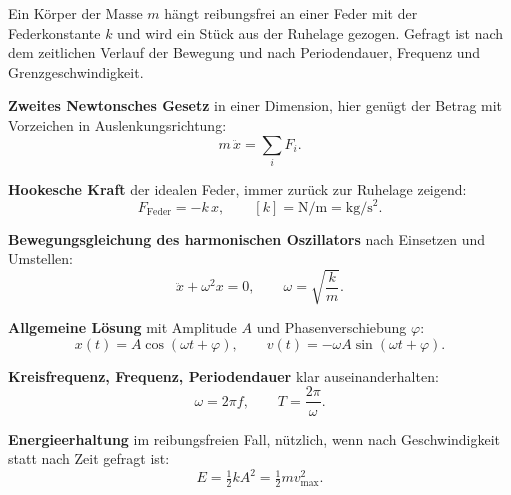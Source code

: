 

Ein Körper der Masse $m$ hängt reibungsfrei an einer Feder mit der
Federkonstante $k$ und wird ein Stück aus der Ruhelage gezogen. Gefragt ist
nach dem zeitlichen Verlauf der Bewegung und nach Periodendauer, Frequenz und
Grenzgeschwindigkeit.

\begin{werkzeugkasten}[Werkzeuge]
\textbf{Zweites Newtonsches Gesetz} in einer Dimension, hier genügt der Betrag
mit Vorzeichen in Auslenkungsrichtung:
\begin{equation}
  m\,\ddot{x} = \sum_i F_i .
\end{equation}

\textbf{Hookesche Kraft} der idealen Feder, immer zurück zur Ruhelage zeigend:
\begin{equation}
  F_{\text{Feder}} = -k\,x, \qquad [k] = \si{\newton\per\metre} = \si{\kilo\gram\per\second\squared}.
\end{equation}

\textbf{Bewegungsgleichung des harmonischen Oszillators} nach Einsetzen und
Umstellen:
\begin{equation}
  \ddot{x} + \omega^2 x = 0, \qquad \omega = \sqrt{\frac{k}{m}} .
\end{equation}

\textbf{Allgemeine Lösung} mit Amplitude $A$ und Phasenverschiebung $\varphi$:
\begin{equation}
  x(t) = A\cos(\omega t + \varphi), \qquad
  v(t) = -\omega A \sin(\omega t + \varphi) .
\end{equation}

\textbf{Kreisfrequenz, Frequenz, Periodendauer} klar auseinanderhalten:
\begin{equation}
  \omega = 2\pi f, \qquad T = \frac{2\pi}{\omega} .
\end{equation}

\textbf{Energieerhaltung} im reibungsfreien Fall, nützlich, wenn nach
Geschwindigkeit statt nach Zeit gefragt ist:
\begin{equation}
  E = \tfrac{1}{2} k A^2 = \tfrac{1}{2} m v_{\max}^2 .
\end{equation}
\end{werkzeugkasten}

